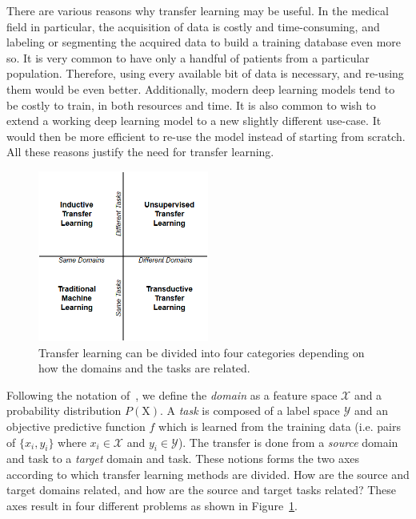 There are various reasons why transfer learning may be useful. In the medical field in particular, the acquisition of data is costly and time-consuming, and labeling or segmenting the acquired data to build a training database even more so. It is very common to have only a handful of patients from a particular population. Therefore, using every available bit of data is necessary, and re-using them would be even better. Additionally, modern deep learning models tend to be costly to train, in both resources and time. It is also common to wish to extend a working deep learning model to a new slightly different use-case. It would then be more efficient to re-use the model instead of starting from scratch. All these reasons justify the need for transfer learning.

\begin{figure}[h]
    \centering
	\includegraphics[width=0.5\textwidth]{img_transfer/transfer_types.png}
    \caption{Transfer learning can be divided into four categories depending on how the domains and the tasks are related.}
    \label{fig:transfer_types}
\end{figure}

Following the notation of~\textcite{pan2010TNDE}, we define the \textit{domain} as a feature space $\mathcal{X}$ and a probability distribution $P\left( \mathrm{X} \right)$. A \textit{task} is composed of a label space $\mathcal{Y}$ and an objective predictive function $f$ which is learned from the training data (i.e. pairs of $\{ x_i, y_i \}$ where $x_i \in \mathcal{X}$ and $y_i \in \mathcal{Y}$). The transfer is done from a \textit{source} domain and task to a \textit{target} domain and task. These notions forms the two axes according to which transfer learning methods are divided. How are the source and target domains related, and how are the source and target tasks related? These axes result in four different problems as shown in Figure~\ref{fig:transfer_types}. 

